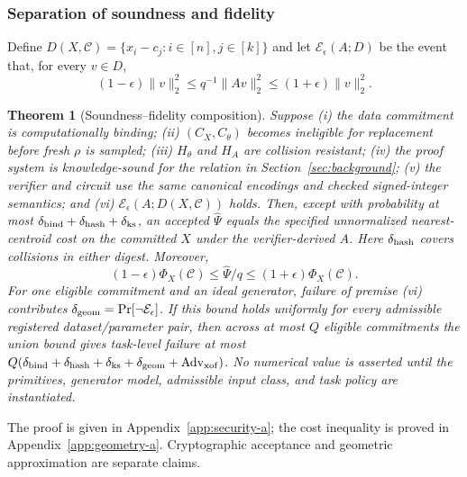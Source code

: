 \documentclass[pdflatex,sn-mathphys-num,iicol]{sn-jnl}
\newcommand{\tpexplain}[1]{}
\theoremstyle{plain}
\newtheorem{theorem}{Theorem}
\theoremstyle{definition}
\theoremstyle{remark}
\begin{document}
\subsubsection{Separation of soundness and fidelity}
\tpexplain{State a composition theorem with explicit assumptions. Do not imply that ZK soundness proves the JL event.}
Define $D(X,\mathcal C)=\{x_i-c_j:i\in[n],j\in[k]\}$ and
let $\mathcal E_\epsilon(A;D)$ be the event that, for every $v\in D$,
\begin{equation*}
(1-\epsilon)\|v\|_2^2
\le q^{-1}\|Av\|_2^2
\le(1+\epsilon)\|v\|_2^2.
\end{equation*}
\begin{theorem}[Soundness--fidelity composition]\label{thm:composition-a}
Suppose (i) the data commitment is computationally binding; (ii) $(C_X,C_\theta)$ becomes ineligible for replacement before fresh $\rho$ is sampled; (iii) $H_\theta$ and $H_A$ are collision resistant; (iv) the proof system is knowledge-sound for the relation in Section~\ref{sec:background}; (v) the verifier and circuit use the same canonical encodings and checked signed-integer semantics; and (vi) $\mathcal E_\epsilon(A;D(X,\mathcal C))$ holds. Then, except with probability at most $\delta_{\rm bind}+\delta_{\rm hash}+\delta_{\rm ks}$, an accepted $\widehat\Psi$ equals the specified unnormalized nearest-centroid cost on the committed $X$ under the verifier-derived $A$. Here $\delta_{\rm hash}$ covers collisions in either digest. Moreover,
\[
(1-\epsilon)\Phi_X(\mathcal C)\le \widehat\Psi/q\le(1+\epsilon)\Phi_X(\mathcal C).
\]
For one eligible commitment and an ideal generator, failure of premise (vi) contributes $\delta_{\rm geom}=\Pr[\neg\mathcal E_\epsilon]$. If this bound holds uniformly for every admissible registered dataset/parameter pair, then across at most $Q$ eligible commitments the union bound gives task-level failure at most $Q(\delta_{\rm bind}+\delta_{\rm hash}+\delta_{\rm ks}+\delta_{\rm geom}+\operatorname{Adv}_{\rm xof})$. No numerical value is asserted until the primitives, generator model, admissible input class, and task policy are instantiated.
\end{theorem}
The proof is given in Appendix~\ref{app:security-a}; the cost inequality is proved in Appendix~\ref{app:geometry-a}. Cryptographic acceptance and geometric approximation are separate claims.
\end{document}
